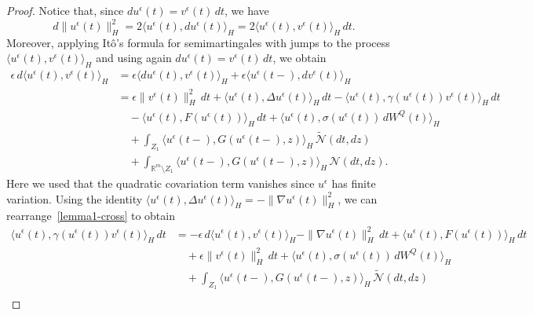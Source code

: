\documentclass[11pt]{article}
\theoremstyle{plain}
\numberwithin{equation}{section}
\begin{document}
\begin{proof}
Notice that, since $du^{\epsilon}(t)=v^{\epsilon}(t)\,dt$, we have
\begin{equation}\label{lemma1-1}
d\|u^{\epsilon}(t)\|_{H}^2
=2\langle u^{\epsilon}(t),du^{\epsilon}(t)\rangle_{H}
=2\langle u^{\epsilon}(t),v^{\epsilon}(t)\rangle_{H}\,dt .
\end{equation}
Moreover, applying It\^{o}'s formula for semimartingales with jumps to the
process $\langle u^{\epsilon}(t),v^{\epsilon}(t)\rangle_{H}$ and using again
$du^{\epsilon}(t)=v^{\epsilon}(t)\,dt$, we obtain
\begin{align}
\epsilon\, d\langle u^{\epsilon}(t),v^{\epsilon}(t)\rangle_{H}
&=\epsilon\langle du^{\epsilon}(t),v^{\epsilon}(t)\rangle_{H}
+\epsilon\langle u^{\epsilon}(t-),dv^{\epsilon}(t)\rangle_{H} \nonumber\\
&=\epsilon\|v^{\epsilon}(t)\|_{H}^2\,dt
+\Big\langle u^{\epsilon}(t),\Delta u^{\epsilon}(t)\Big\rangle_H\,dt
-\Big\langle u^{\epsilon}(t),\gamma(u^{\epsilon}(t))v^{\epsilon}(t)\Big\rangle_H\,dt \nonumber\\
&\quad
-\Big\langle u^{\epsilon}(t),F(u^{\epsilon}(t))\Big\rangle_H\,dt
+\Big\langle u^{\epsilon}(t),\sigma(u^{\epsilon}(t))\,dW^Q(t)\Big\rangle_H \nonumber\\
&\quad
+\int_{Z_1}\Big\langle u^{\epsilon}(t-),G(u^{\epsilon}(t-),z)\Big\rangle_H\,\tilde{\mathcal N}(dt,dz)\nonumber\\
&\quad+\int_{\mathbb R^m\setminus Z_1}\Big\langle u^{\epsilon}(t-),G(u^{\epsilon}(t-),z)\Big\rangle_H\, {\mathcal N}(dt,dz).
\label{lemma1-cross}
\end{align}
Here we used that the quadratic covariation term vanishes since $u^{\epsilon}$
has finite variation. Using the identity
$\langle u^{\epsilon}(t),\Delta u^{\epsilon}(t)\rangle_H=-\|\nabla u^{\epsilon}(t)\|_H^2$,
we can rearrange~\eqref{lemma1-cross} to obtain
\begin{align}\label{lemma1-2-plusF}
\big\langle u^{\epsilon}(t),\gamma(u^{\epsilon}(t))v^{\epsilon}(t)\big\rangle_H\,dt
&= -\epsilon\, d\langle u^{\epsilon}(t),v^{\epsilon}(t)\rangle_H
-\|\nabla u^{\epsilon}(t)\|_H^2\,dt
+\big\langle u^{\epsilon}(t),F(u^{\epsilon}(t))\big\rangle_H\,dt  \nonumber\\
&\quad
+\epsilon\|v^{\epsilon}(t)\|_H^2\,dt
+\big\langle u^{\epsilon}(t),\sigma(u^{\epsilon}(t))\,dW^Q(t)\big\rangle_H \nonumber\\
&\quad
+\int_{Z_1}\big\langle u^{\epsilon}(t-),G(u^{\epsilon}(t-),z)\big\rangle_H\,\tilde{\mathcal N}(dt,dz)\nonumber\\

\end{align}
\end{proof}
\end{document}
